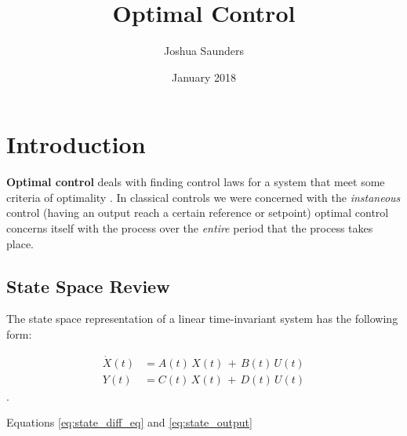 \documentclass{article}
\title{Optimal Control}
\author{Joshua Saunders}
\date{January 2018}
\begin{document}
\maketitle

\section{Introduction}
\textbf{Optimal control} deals with finding control laws for a system that meet 
some criteria of optimality \cite{wiki:1}. In classical controls we were 
concerned with the \textit{instaneous} control (having an output reach a
certain reference or setpoint) optimal control concerns itself with the
process over the \textit{entire} period that the process takes place.

\subsection{State Space Review}

The state space representation of a linear time-invariant system has the 
following form:

\begin{align}     
    \dot{X}(t) &= A(t) \, X(t) \, + \, B(t) \, U(t) \label{eq:state_diff_eq}\\
    Y(t) &= C(t) \, X(t) \, + \, D(t) \, U(t) \label{eq:state_output}
\end{align}.

Equations \ref{eq:state_diff_eq} and \ref{eq:state_output} 



\end{document}

